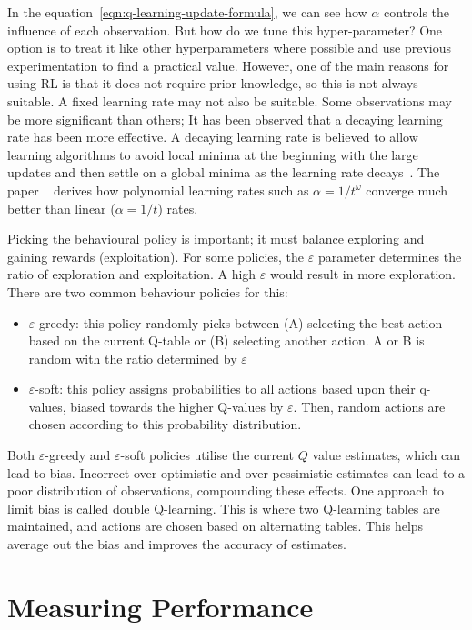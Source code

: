 \documentclass[]{final_report}
\begin{document}
In the equation~\ref{eqn:q-learning-update-formula}, we can see how $\alpha$ controls the influence of each observation. But how do we tune this hyper-parameter? One option is to treat it like other hyperparameters where possible and use previous experimentation to find a practical value. However, one of the main reasons for using RL is that it does not require prior knowledge, so this is not always suitable. A fixed learning rate may not also be suitable. Some observations may be more significant than others; It has been observed that a decaying learning rate has been more effective. A decaying learning rate is believed to allow learning algorithms to avoid local minima at the beginning with the large updates and then settle on a global minima as the learning rate decays~\cite{decayingLearningRates}. The paper ~\cite{even2003learning} derives how polynomial learning rates such as $\alpha = 1/t^\omega$ converge much better than linear ($\alpha = 1/t$) rates.

Picking the behavioural policy is important; it must balance exploring and gaining rewards (exploitation). For some policies, the $\varepsilon$ parameter determines the ratio of exploration and exploitation. A high $\varepsilon$ would result in more exploration. There are two common behaviour policies for this:
\begin{itemize}
  \item $\varepsilon$-greedy: this policy randomly picks between (A) selecting the best action based on the current Q-table or (B) selecting another action. A or B is random with the ratio determined by $\varepsilon$
  \item $\varepsilon$-soft: this policy assigns probabilities to all actions based upon their q-values, biased towards the higher Q-values by $\varepsilon$. Then, random actions are chosen according to this probability distribution.
\end{itemize}

Both $\varepsilon$-greedy and $\varepsilon$-soft policies utilise the current $Q$ value estimates, which can lead to bias. Incorrect over-optimistic and over-pessimistic estimates can lead to a poor distribution of observations, compounding these effects. One approach to limit bias is called double Q-learning. This is where two Q-learning tables are maintained, and actions are chosen based on alternating tables. This helps average out the bias and improves the accuracy of estimates.


\section{Measuring Performance}\label{section:measuring-performance}
\end{document}
